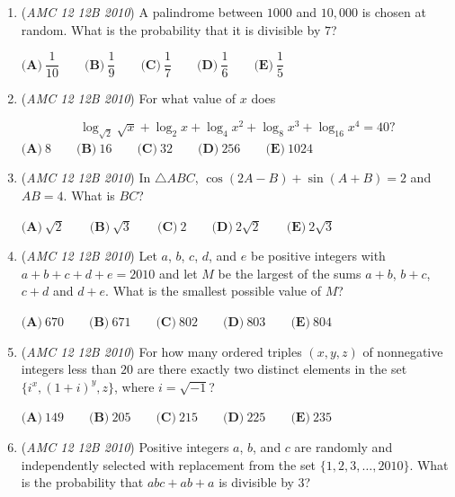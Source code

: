 \begin{enumerate}
 $\textbf{(A)}\ \dfrac{49}{101} \qquad \textbf{(B)}\ \dfrac{50}{101} \qquad \textbf{(C)}\ \dfrac{1}{2} \qquad \textbf{(D)}\ \dfrac{51}{101} \qquad \textbf{(E)}\ \dfrac{50}{99}$


	\item (\textit{AMC 12 12B 2010}) A palindrome between $1000$ and $10,000$ is chosen at random. What is the probability that it is divisible by $7$?


 $\textbf{(A)}\ \dfrac{1}{10} \qquad \textbf{(B)}\ \dfrac{1}{9} \qquad \textbf{(C)}\ \dfrac{1}{7} \qquad \textbf{(D)}\ \dfrac{1}{6} \qquad \textbf{(E)}\ \dfrac{1}{5}$


	\item (\textit{AMC 12 12B 2010}) For what value of $x$ does


 
 \[\log_{\sqrt{2}}\sqrt{x}+\log_{2}{x}+\log_{4}{x^2}+\log_{8}{x^3}+\log_{16}{x^4}=40?\]
$\textbf{(A)}\ 8 \qquad \textbf{(B)}\ 16 \qquad \textbf{(C)}\ 32 \qquad \textbf{(D)}\ 256 \qquad \textbf{(E)}\ 1024$


	\item (\textit{AMC 12 12B 2010}) In $\triangle ABC$, $\cos(2A-B)+\sin(A+B)=2$ and $AB=4$. What is $BC$?


 $\textbf{(A)}\ \sqrt{2} \qquad \textbf{(B)}\ \sqrt{3} \qquad \textbf{(C)}\ 2 \qquad \textbf{(D)}\ 2\sqrt{2} \qquad \textbf{(E)}\ 2\sqrt{3}$


	\item (\textit{AMC 12 12B 2010}) Let $a$, $b$, $c$, $d$, and $e$ be positive integers with $a+b+c+d+e=2010$ and let $M$ be the largest of the sums $a+b$, $b+c$, $c+d$ and $d+e$. What is the smallest possible value of $M$?


 $\textbf{(A)}\ 670 \qquad \textbf{(B)}\ 671 \qquad \textbf{(C)}\ 802 \qquad \textbf{(D)}\ 803 \qquad \textbf{(E)}\ 804$


	\item (\textit{AMC 12 12B 2010}) For how many ordered triples $(x,y,z)$ of nonnegative integers less than $20$ are there exactly two distinct elements in the set $\{i^x, (1+i)^y, z\}$, where $i=\sqrt{-1}$?


 $\textbf{(A)}\ 149 \qquad \textbf{(B)}\ 205 \qquad \textbf{(C)}\ 215 \qquad \textbf{(D)}\ 225 \qquad \textbf{(E)}\ 235$


	\item (\textit{AMC 12 12B 2010}) Positive integers $a$, $b$, and $c$ are randomly and independently selected with replacement from the set $\{1, 2, 3,\dots, 2010\}$. What is the probability that $abc + ab + a$ is divisible by $3$?



\end{enumerate}
